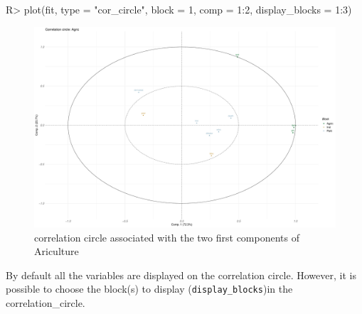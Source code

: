 \documentclass[
]{jss}
\begin{document}
\begin{CodeChunk}
\begin{CodeInput}
R> plot(fit, type = "cor_circle", block = 1, comp = 1:2, display_blocks = 1:3)
\end{CodeInput}
\begin{figure}

{\centering \includegraphics{RGCCA_21022023_files/figure-latex/unnamed-chunk-10-1} 

}

\caption[correlation circle associated with the two first components of Ariculture]{correlation circle associated with the two first components of Ariculture}\label{fig:unnamed-chunk-10}
\end{figure}
\end{CodeChunk}

\normalsize

By default all the variables are displayed on the correlation circle.
However, it is possible to choose the block(s) to display
(\texttt{display\_blocks})in the correlation\_circle.

\footnotesize
\end{document}
